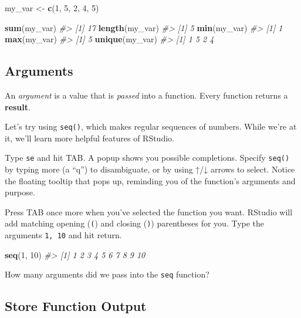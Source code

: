 \documentclass[]{book}
\newenvironment{Shaded}{\begin{snugshade}}{\end{snugshade}}
\newcommand{\KeywordTok}[1]{\textcolor[rgb]{0.13,0.29,0.53}{\textbf{#1}}}
\newcommand{\DecValTok}[1]{\textcolor[rgb]{0.00,0.00,0.81}{#1}}
\newcommand{\StringTok}[1]{\textcolor[rgb]{0.31,0.60,0.02}{#1}}
\newcommand{\CommentTok}[1]{\textcolor[rgb]{0.56,0.35,0.01}{\textit{#1}}}
\newcommand{\NormalTok}[1]{#1}
\begin{document}
\begin{Shaded}
\begin{Highlighting}[]
\NormalTok{my_var <-}\StringTok{ }\KeywordTok{c}\NormalTok{(}\DecValTok{1}\NormalTok{, }\DecValTok{5}\NormalTok{, }\DecValTok{2}\NormalTok{, }\DecValTok{4}\NormalTok{, }\DecValTok{5}\NormalTok{)}

\KeywordTok{sum}\NormalTok{(my_var)}
\CommentTok{#> [1] 17}
\KeywordTok{length}\NormalTok{(my_var)}
\CommentTok{#> [1] 5}
\KeywordTok{min}\NormalTok{(my_var)}
\CommentTok{#> [1] 1}
\KeywordTok{max}\NormalTok{(my_var)}
\CommentTok{#> [1] 5}
\KeywordTok{unique}\NormalTok{(my_var)}
\CommentTok{#> [1] 1 5 2 4}
\end{Highlighting}
\end{Shaded}

\subsection{Arguments}\label{arguments}

An \emph{argument} is a value that is \emph{passed} into a function.
Every function returns a \textbf{result}.

Let's try using \texttt{seq()}, which makes regular sequences of
numbers. While we're at it, we'll learn more helpful features of
RStudio.

Type \texttt{se} and hit TAB. A popup shows you possible completions.
Specify \texttt{seq()} by typing more (a ``q'') to disambiguate, or by
using ↑/↓ arrows to select. Notice the floating tooltip that pops up,
reminding you of the function's arguments and purpose.

Press TAB once more when you've selected the function you want. RStudio
will add matching opening (\texttt{(}) and closing (\texttt{)})
parentheses for you. Type the arguments \texttt{1,\ 10} and hit return.

\begin{Shaded}
\begin{Highlighting}[]
\KeywordTok{seq}\NormalTok{(}\DecValTok{1}\NormalTok{, }\DecValTok{10}\NormalTok{)}
\CommentTok{#>  [1]  1  2  3  4  5  6  7  8  9 10}
\end{Highlighting}
\end{Shaded}

How many arguments did we pass into the \texttt{seq} function?

\subsection{Store Function Output}\label{store-function-output}
\end{document}
